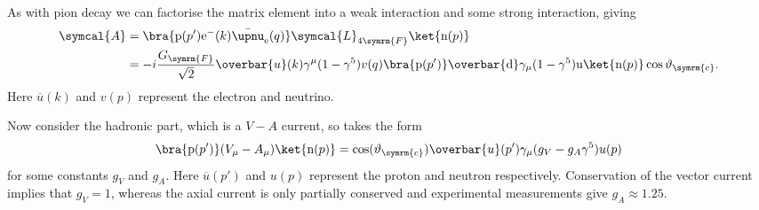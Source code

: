 \documentclass[fleqn]{NotesClass}
\newcommand{\Pparticle}[1]{\mathrm{#1}}
\newcommand{\Pu}{\ensuremath{\Pparticle{u}}}
\newcommand{\Pd}{\ensuremath{\Pparticle{d}}}
\newcommand{\Pe}{\ensuremath{\Pparticle{e}^{-}}}
\newcommand{\Pp}{\ensuremath{\Pparticle{p}}}
\newcommand{\Pn}{\ensuremath{\Pparticle{n}}}
\newcommand{\APantiparticle}[1]{\bar{#1}}
\newcommand{\APnue}{\ensuremath{\APantiparticle{\upnu}_{\mathrm{e}}}}
\newcommand{\diracadjoint}[1]{\overbar{#1}}
\newcommand{\lagrangianDensity}{\symcal{L}}
\newcommand{\amplitude}{\symcal{A}}
\newcommand{\fermiConst}{G_{\symrm{F}}}
\newcommand{\cabibboangle}{\vartheta_{\symrm{c}}}
\begin{document}
    As with pion decay we can factorise the matrix element into a weak interaction and some strong interaction, giving
    \begin{align}
        \amplitude &= \bra{\Pp(p') \Pe(k) \APnue(q)} \lagrangianDensity_{4\symrm{F}} \ket{\Pn(p)}\\
        &= -i\frac{\fermiConst}{\sqrt{2}} \diracadjoint{u}(k) \gamma^\mu(1 - \gamma^5)v(q) \bra{\Pp(p')} \diracadjoint{\Pd}\gamma_\mu(1 - \gamma^5)\Pu\ket{\Pn(p)} \cos\cabibboangle.
    \end{align}
    Here \(\diracadjoint{u}(k)\) and \(v(p)\) represent the electron and neutrino.
    
    Now consider the hadronic part, which is a \(V - A\) current, so takes the form
    \begin{equation}
        \bra{\Pp(p')} (V_\mu - A_\mu) \ket{\Pn(p)} = \cos(\cabibboangle) \diracadjoint{u}(p')\gamma_\mu(g_V - g_A\gamma^5) u(p)
    \end{equation}
    for some constants \(g_V\) and \(g_A\).
    Here \(\diracadjoint{u}(p')\) and \(u(p)\) represent the proton and neutron respectively.
    Conservation of the vector current implies that \(g_V = 1\), whereas the axial current is only partially conserved and experimental measurements give \(g_{A} \approx 1.25\).
    
\end{document}
